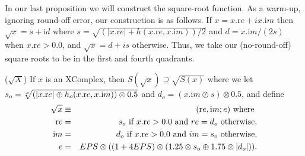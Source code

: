 In our last proposition we will construct the square-root function.  As a warm-up, ignoring round-off error, our
construction is as follows.  If $x = x.{\mathrm re} + i x.{\mathrm im}$ then $\sqrt{x} = s + {\mathrm i d}$ where $s=\sqrt{(|x.{\mathrm
re}| + h(x.{\mathrm re},x.{\mathrm im}))/2}$ and $d = x.{\mathrm im}/(2s)$ when $x.{\mathrm re} > 0.0$, and $\sqrt{x} = d + i s$ otherwise.  
Thus, we take our (no-round-off) square roots to be in the first and fourth quadrants.

\begin{proposition}\label{GMT 7.14}{($\sqrt{X}$)}
If $x$ is an {\textrm XComplex,} then $S(\sqrt{x}) \supseteq \sqrt{S(x)}$
where we
let $s_o = \root o \of {(|x.{\mathrm re}| \oplus h_o (x.{\mathrm re},x.{\mathrm im})) \otimes 0.5}$
 and $d_o = (x.{\mathrm im} \oslash s) \otimes 0.5${\textrm ,} and define
\begin{eqnarray*}
 \sqrt{x} & \equiv &({\mathrm re},{\mathrm im};e) \hbox{ where }\\
 {\mathrm re} &=& s_o \hbox{ if $x.{\mathrm re} > 0.0$ and $re = d_o$ otherwise},\\
{\mathrm im}& =& d_o \hbox{ if $x.{\mathrm re} > 0.0$ and $im = s_o$ otherwise},
\\
e& =& EPS \otimes ((1 + 4 EPS) \otimes (1.25 \otimes s_o \oplus 1.75 \otimes |d_o|)).
\end{eqnarray*}
\end{proposition}


